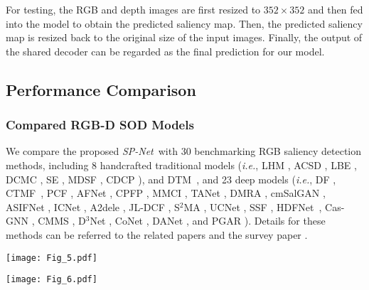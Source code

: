 \documentclass[10pt,twocolumn,letterpaper]{article}
\def\ie{\emph{i.e.}}
\def\ours{\emph{SP-Net}}
\begin{document}
For testing, the RGB and depth images are first resized to $352\times{352}$ and then fed into the model to obtain the predicted saliency map. Then, the predicted saliency map is resized back to the original size of the input images. Finally, the output of the shared decoder can be regarded as the final prediction for our model.


\subsection{Performance Comparison}
\label{results}


\subsubsection{Compared RGB-D SOD Models}

We compare the proposed \ours~with 30 benchmarking RGB saliency detection methods, including 8 handcrafted traditional models (\ie, LHM \cite{peng2014rgbd}, ACSD \cite{ju2014depth}, LBE \cite{feng2016local}, DCMC \cite{cong2016saliency}, SE \cite{guo2016salient}, MDSF \cite{song2017depth}, CDCP \cite{zhu2017innovative}), and DTM~\cite{cong2019going}, and 23 deep models (\ie, DF \cite{qu2017rgbd}, CTMF~\cite{han2017cnns}, PCF \cite{chen2018progressively}, AFNet \cite{wang2019adaptive}, CPFP \cite{zhao2019contrast}, MMCI \cite{chen2019multi}, TANet \cite{chen2019three}, DMRA \cite{piao2019depth}, cmSalGAN \cite{jiang2020cmsalgan}, ASIFNet \cite{li2020asif}, ICNet \cite{li2020icnet}, A2dele \cite{piao2020}, JL-DCF \cite{fu2020jl}, S$^2$MA \cite{liu2020}, UCNet \cite{zhang2020uc}, SSF \cite{zhang2020}, HDFNet~\cite{paneccv2020}, Cas-GNN \cite{luoECCV2020}, CMMS \cite{li2020}, D$^3$Net \cite{fan2019rethinking}, CoNet \cite{Wei_2020_ECCV}, DANet \cite{zhaoeccv20}, and PGAR \cite{chen2020progressively}). Details for these methods can be referred to the related papers and the survey paper \cite{zhou2021rgb}.

\begin{figure*}
	\begin{centering}
		\texttt{[image: Fig\_5.pdf]}
		\caption{PR curves on six datasets (\ie, NJU2K \cite{ju2014depth}, STERE \cite{niu2012leveraging}, DES \cite{cheng2014depth}, NLPR \cite{peng2014rgbd}, SSD~\cite{zhu2017three}, and SIP \cite{fan2019rethinking}).}
		\label{fig05}
	\end{centering}
\end{figure*}

\begin{figure*}
	\begin{centering}
		\texttt{[image: Fig\_6.pdf]}
		\caption{F-measure curves under different thresholds on six datasets (\ie, NJU2K \cite{ju2014depth}, STERE \cite{niu2012leveraging}, DES \cite{cheng2014depth}, NLPR \cite{peng2014rgbd}, SSD~\cite{zhu2017three}, and SIP \cite{fan2019rethinking}).}
		\label{fig06}
	\end{centering}
\end{figure*}
\end{document}
